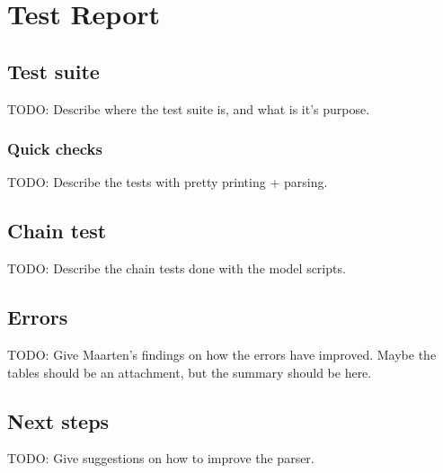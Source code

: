 
\section{Test Report}
\label{sec:tests}

\subsection{Test suite}
TODO: Describe where the test suite is, and what is it's purpose.

\subsubsection{Quick checks}
TODO: Describe the tests with pretty printing + parsing.

\subsection{Chain test}
TODO: Describe the chain tests done with the model scripts.

\subsection{Errors}
TODO: Give Maarten's findings on how the errors have improved. Maybe the tables should be an attachment, but the summary should be here.

\subsection{Next steps}
TODO: Give suggestions on how to improve the parser.
